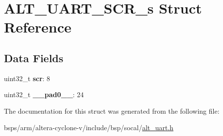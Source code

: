 \hypertarget{structALT__UART__SCR__s}{}\section{A\+L\+T\+\_\+\+U\+A\+R\+T\+\_\+\+S\+C\+R\+\_\+s Struct Reference}
\label{structALT__UART__SCR__s}
\subsection*{Data Fields}
\begin{DoxyCompactItemize}
\item 
\mbox{\label{structALT__UART__SCR__s_a0fee03e082f164f10f45f24c03e35eb7}} 
uint32\+\_\+t {\bfseries scr}\+: 8
\item 
\mbox{\label{structALT__UART__SCR__s_a070b7386cc09024d8c9c47f148c897ad}} 
uint32\+\_\+t {\bfseries \+\_\+\+\_\+pad0\+\_\+\+\_\+}\+: 24
\end{DoxyCompactItemize}


The documentation for this struct was generated from the following file\+:\begin{DoxyCompactItemize}
\item 
bsps/arm/altera-\/cyclone-\/v/include/bsp/socal/\mbox{\hyperlink{alt__uart_8h}{alt\+\_\+uart.\+h}}\end{DoxyCompactItemize}
